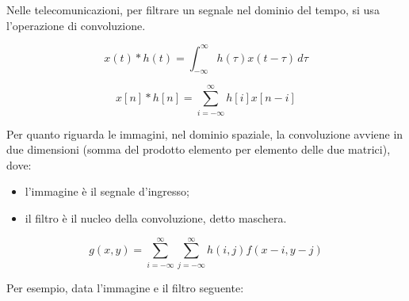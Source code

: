 Nelle telecomunicazioni, per filtrare un segnale nel dominio del tempo, si usa l'operazione di convoluzione.
\begin{center}
\begin{minipage}{0.48\textwidth} %
    \centering
    \begin{equation*}
        x(t)*h(t)=\int_{-\infty}^{\infty}h(\tau)x(t-\tau)\, d\tau
    \end{equation*}
\end{minipage}
\hfill %
\begin{minipage}{0.48\textwidth} %
    \centering
    \begin{equation*}
        x[n]*h[n]=\sum_{i=-\infty}^{\infty}h[i]x[n-i]
    \end{equation*}
\end{minipage}
\end{center}
Per quanto riguarda le immagini, nel dominio spaziale, la convoluzione avviene in due dimensioni (somma del prodotto elemento per elemento delle due matrici), dove:
\begin{center}
\begin{minipage}{0.48\textwidth} %
    \centering
    \begin{itemize}
    \item l'immagine è il segnale d'ingresso;
    \item il filtro è il nucleo della convoluzione, detto maschera.
    \end{itemize}
\end{minipage}
\hfill %
\begin{minipage}{0.48\textwidth} %
    \centering
    \begin{equation*}
    g(x,y)=\sum_{i=-\infty}^{\infty}\sum_{j=-\infty}^{\infty}h(i,j)f(x-i,y-j)
    \end{equation*}
\end{minipage}
\end{center}
Per esempio, data l'immagine e il filtro seguente:
